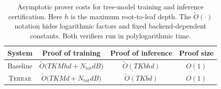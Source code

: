 \begin{table}[t]
    \centering
    \caption{Asymptotic prover costs for tree-model training and inference
    certification. Here $h$ is the maximum root-to-leaf depth.
    The
    $\tilde{O}(\cdot)$ notation hides logarithmic factors and fixed
    backend-dependent constants.
    Both verifiers run in polylogarithmic time.}
    \label{tab:complexity-comparison}
    \begin{tabular}{cccc}
        \toprule
        System & Proof of training & Proof of inference & Proof size\\
        \midrule
        Baseline
        & $\tilde{O}\bigl(TKMhd+N_{\mathrm{tot}}dB\bigr)$
        & $\tilde{O}(TKbhd)$
        & $O(1)$ \\
        \textsc{Terrae}
        & $\tilde{O}\bigl(TKMd+N_{\mathrm{tot}}dB\bigr)$
        & $\tilde{O}(TKbd)$
        & $O(1)$ \\
        \bottomrule
    \end{tabular}
\end{table}
